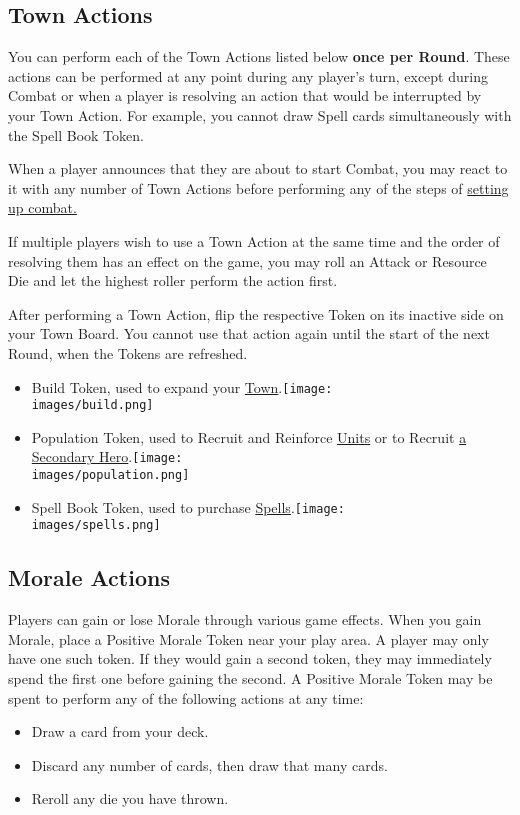 \subsection*{Town Actions}
You can perform each of the Town Actions listed below \textbf{once per Round}.
These actions can be performed at any point during any player’s turn, except during Combat or when a player is resolving an action that would be interrupted by your Town Action.
For example, you cannot draw Spell cards simultaneously with the Spell Book Token.\par
When a player announces that they are about to start Combat, you may react to it with any number of Town Actions before performing any of the steps of \hyperlink{Combatsetup}{setting up combat.}\par
If multiple players wish to use a Town Action at the same time and the order of resolving them has an effect on the game, you may roll an Attack or Resource Die and let the highest roller perform the action first.\par
After performing a Town Action, flip the respective Token on its inactive side on your Town Board.
You cannot use that action again until the start of the next Round, when the Tokens are refreshed.
\begin{itemize}
  \item Build Token, used to expand your \hyperlink{Town}{Town}.\texttt{[image: \\images/build.png]}
  \item Population Token, used to Recruit and Reinforce \hyperlink{Units}{Units} or to Recruit \hyperlink{Secondary}{a Secondary Hero}.\texttt{[image: \\images/population.png]}
  \item Spell Book Token, used to purchase \hyperlink{spells}{Spells}.\texttt{[image: \\images/spells.png]}
\end{itemize}

\subsection*{Morale Actions}
Players can gain or lose Morale through various game effects.
When you gain Morale, place a Positive Morale Token  near your play area.
A player may only have one such token.
If they would gain a second token, they may immediately spend the first one before gaining the second.
A Positive Morale Token may be spent to perform any of the following actions at any time:
\begin{itemize}
\item Draw a card from your deck.
\item Discard any number of cards, then draw that many cards.
\item Reroll any die you have thrown.
\end{itemize}

